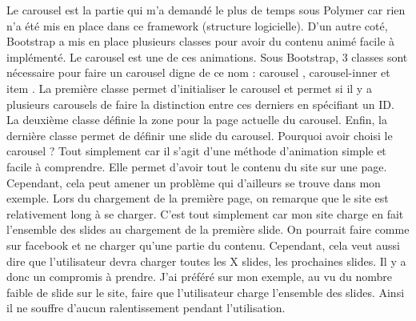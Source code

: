 \documentclass{article}
\begin{document}
Le carousel est la partie qui m'a demand\'e le plus de temps sous Polymer car rien n'a \'et\'e mis en place dans ce framework (structure logicielle). D'un autre cot\'e, Bootstrap a mis en place plusieurs classes pour avoir du contenu anim\'e facile \`a impl\'ement\'e. Le carousel est une de ces animations. Sous Bootstrap, 3 classes sont n\'ecessaire pour faire un carousel digne de ce nom : \og carousel \fg{}, \og carousel-inner \fg{} et \og item \fg{}. La premi\`ere classe permet d'initialiser le carousel et permet si il y a plusieurs carousels de faire la distinction entre ces derniers en sp\'ecifiant un ID. La deuxi\`eme classe d\'efinie la zone pour la page actuelle du carousel. Enfin, la derni\`ere classe permet de d\'efinir une slide du carousel. Pourquoi avoir choisi le carousel ? Tout simplement car il s'agit d'une m\'ethode d'animation simple et facile \`a comprendre. Elle permet d'avoir tout le contenu du site sur une page. Cependant, cela peut amener un probl\`eme qui d'ailleurs se trouve dans mon exemple. Lors du chargement de la premi\`ere page, on remarque que le site est relativement long \`a se charger. C'est tout simplement car mon site charge en fait l'ensemble des slides au chargement de la premi\`ere slide. On pourrait faire comme sur facebook et ne charger qu'une partie du contenu. Cependant, cela veut aussi dire que l'utilisateur devra charger toutes les X slides, les prochaines slides. Il y a donc un compromis \`a prendre. J'ai pr\'ef\'er\'e sur mon exemple, au vu du nombre faible de slide sur le site, faire que l'utilisateur charge l'ensemble des slides. Ainsi il ne souffre d'aucun ralentissement pendant l'utilisation.
\vspace{0.5cm}\\
\end{document}
